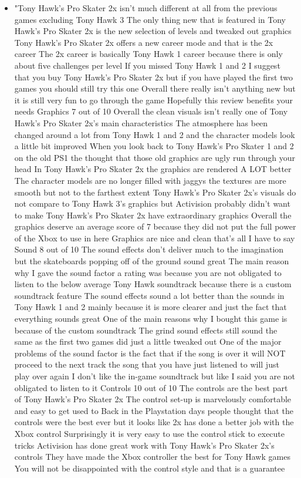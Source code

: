 \documentclass{article}
\begin{document}
\begin{itemize}
	\begin{itemize}
		\item "Tony Hawk's Pro Skater 2x  isn't much different at all from the previous games  excluding Tony Hawk 3   The only thing new that is featured in Tony Hawk's Pro Skater 2x  is the new selection of levels  and tweaked out graphics  Tony Hawk's Pro Skater 2x offers a new career mode  and that is the 2x career  The 2x career is basically Tony Hawk 1 career  because there is only about five challenges per level  If you missed Tony Hawk 1 and 2  I suggest that you buy Tony Hawk's Pro Skater 2x  but if you have played the first two games  you should still try this one  Overall  there really isn't anything new  but it is still very fun to go through the game  Hopefully this review benefits your needs  Graphics  7 out of 10 Overall  the clean visuals isn't really one of Tony Hawk's Pro Skater 2x's main characteristics  The atmosphere has been changed around a lot from Tony Hawk 1 and 2  and the character models look a little bit improved  When you look back to Tony Hawk's Pro Skater 1 and 2 on the old PS1  the thought that those old graphics are ugly run through your head  In Tony Hawk's Pro Skater 2x  the graphics are rendered A LOT better  The character models are no longer filled with jaggys  the textures are more smooth  but not to the farthest extent  Tony Hawk's Pro Skater 2x's visuals do not compare to Tony Hawk 3's graphics  but Activision probably didn't want to make Tony Hawk's Pro Skater 2x have extraordinary graphics  Overall  the graphics deserve an average score of 7 because they did not put the full power of the Xbox to use in here  Graphics are nice  and clean  that's all I have to say  Sound  8 out of 10 The sound effects don't deliver much to the imagination  but the skateboards popping off of the ground sound great  The main reason why I gave the sound factor a rating  was because you are not obligated to listen to the below average Tony Hawk soundtrack  because there is a custom soundtrack feature  The sound effects sound a lot better than the sounds in Tony Hawk 1 and 2  mainly because it is more clearer  and just the fact that everything sounds great  One of the main reasons why I bought this game  is because of the custom soundtrack  The grind sound effects still sound the same as the first two games did  just a little tweaked out  One of the major problems of the sound factor  is the fact that if the song is over  it will NOT proceed to the next track  the song that you have just listened to will just play over again  I don't like the in-game soundtrack  but like I said  you are not obligated to listen to it  Controls  10 out of 10 The controls are the best part of Tony Hawk's Pro Skater 2x  The control set-up is marvelously comfortable  and easy to get used to  Back in the Playstation days  people thought that the controls were the best ever  but it looks like 2x has done a better job with the Xbox control  Surprisingly  it is very easy to use the control stick to execute tricks  Activision has done great work with Tony Hawk's Pro Skater 2x's controls  They have made the Xbox controller the best for Tony Hawk games  You will not be disappointed with the control style  and that is a guarantee  
\end{itemize}
\end{itemize}
\end{document}
